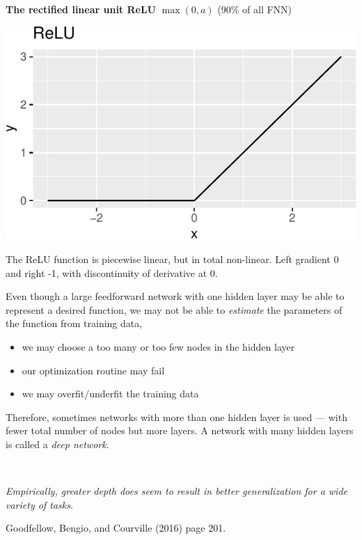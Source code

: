 \documentclass[
  ignorenonframetext,
]{beamer}
\providecommand{\tightlist}{%
  \setlength{\itemsep}{0pt}\setlength{\parskip}{0pt}}
\begin{document}
\begin{frame}
\textbf{The rectified linear unit ReLU} \(\max(0,a)\) (90\% of all FNN)

\includegraphics{L9_files/figure-beamer/unnamed-chunk-4-1.pdf}

The ReLU function is piecewise linear, but in total non-linear. Left
gradient 0 and right -1, with discontinuity of derivative at 0.
\end{frame}

\begin{frame}
Even though a large feedforward network with one hidden layer may be
able to represent a desired function, we may not be able to
\emph{estimate} the parameters of the function from training data,

\begin{itemize}
\tightlist
\item
  we may choose a too many or too few nodes in the hidden layer
\item
  our optimization routine may fail
\item
  we may overfit/underfit the training data
\end{itemize}

Therefore, sometimes networks with more than one hidden layer is used
--- with fewer total number of nodes but more layers. A network with
many hidden layers is called a \emph{deep network}.

\(~\)

\emph{Empirically, greater depth does seem to result in better
generalization for a wide variety of tasks.}

Goodfellow, Bengio, and Courville (2016) page 201.
\end{frame}
\end{document}
